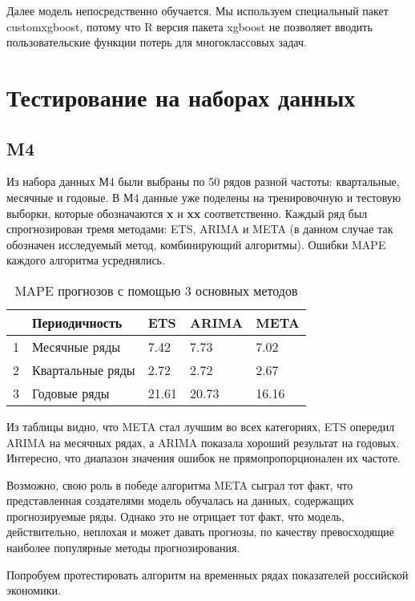 \documentclass[a4paper,12pt]{article}
\theoremstyle{plain} %
\theoremstyle{definition} %
\theoremstyle{remark} %
\begin{document}
  Далее модель непосредственно обучается.
  Мы используем специальный пакет customxgboost, потому что R версия пакета xgboost не позволяет вводить пользовательские функции потерь для многоклассовых задач.


\section{Тестирование на наборах данных}

  \subsection{M4}

  Из набора данных М4 были выбраны по 50 рядов разной частоты: квартальные, месячные и годовые.
  В М4 данные уже поделены на тренировочную и тестовую выборки, которые обозначаются \textbf{x} и \textbf{xx} соответственно.
  Каждый ряд был спрогнозирован тремя методами: ETS, ARIMA и META (в данном случае так обозначен исследуемый метод, комбинирующий алгоритмы). Ошибки MAPE каждого алгоритма усреднялись.

  \begin{table}[ht]
  \centering
  \begin{tabular}{rllll}
    \hline
   & Периодичность & ETS & ARIMA & META \\
    \hline
    1 & Месячные ряды & 7.42 & 7.73 & 7.02 \\
    2 & Квартальные ряды & 2.72 & 2.72 & 2.67 \\
    3 & Годовые ряды & 21.61 & 20.73 & 16.16 \\
     \hline
  \end{tabular}
  \caption{MAPE прогнозов с помощью 3 основных методов}
  \end{table}


  Из таблицы видно, что META стал лучшим во всех категориях, ETS опередил ARIMA на месячных рядах, а ARIMA показала хороший результат на годовых.
  Интересно, что диапазон значения ошибок не прямопропорционален их частоте.

  Возможно, свою роль в победе алгоритма META сыграл тот факт, что представленная создателями модель обучалась на данных, содержащих прогнозируемые ряды.
  Однако это не отрицает тот факт, что модель, действительно, неплохая и может давать прогнозы, по качеству превосходящие наиболее популярные методы прогнозирования.

  Попробуем протестировать алгоритм на временных рядах показателей российской экономики.
\end{document}
